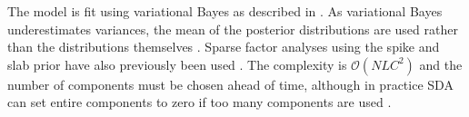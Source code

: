 The model is fit using variational Bayes as described in \parencite{Hore2015Latent, Hore2016Tensor}.
As variational Bayes underestimates variances, the mean of the posterior distributions are used rather than the distributions themselves \parencite{Jaakkola2000Bayesian}.
Sparse factor analyses using the spike and slab prior have also previously been used \parencite{West2003Bayesian, Lucas2006Sparse}.
The complexity is $\mathcal{O}(NLC^2)$ and the number of components must be chosen ahead of time, although in practice SDA can set entire components to zero if too many components are used \parencite{Hore2015Latent, Hore2016Tensor}.






